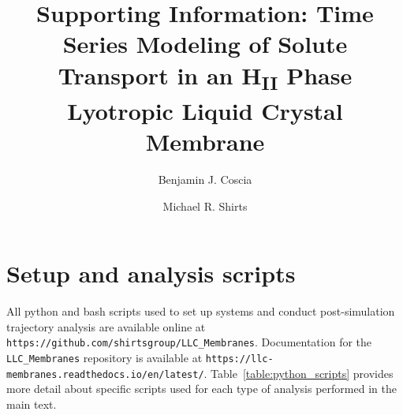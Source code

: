 \documentclass{article}
\title{Supporting Information: Time Series Modeling of Solute Transport in an H\textsubscript{II} 
Phase Lyotropic Liquid Crystal Membrane}
\author{Benjamin J. Coscia \and Michael R. Shirts}
\begin{document}
  \maketitle
  \graphicspath{{./supporting_figures/}}
  
  
  \section{Setup and analysis scripts}\label{section:python_scripts}

  All python and bash scripts used to set up systems and conduct post-simulation trajectory
  analysis are available online at \texttt{https://github.com/shirtsgroup/LLC\_Membranes}.
  Documentation for the \texttt{LLC\_Membranes} repository is available at
  \texttt{https://llc-membranes.readthedocs.io/en/latest/}. Table~\ref{table:python_scripts}
  provides more detail about specific scripts used for each type of analysis performed in
  the main text.
\end{document}
